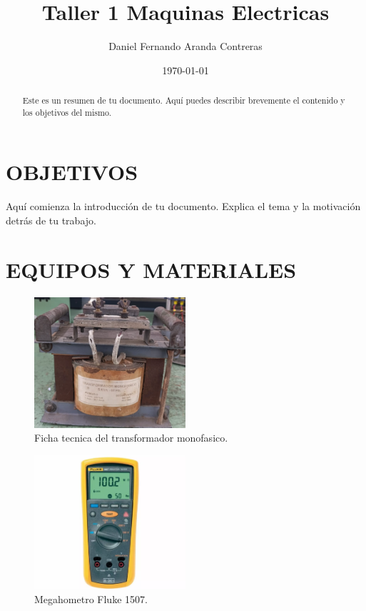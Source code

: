\documentclass[a4paper,12pt]{article} %
\title{Taller 1 Maquinas Electricas} %
\author{Daniel Fernando Aranda Contreras} %
\date{\today} %
\begin{document}
\maketitle %

\begin{abstract}
    
    Este es un resumen de tu documento. Aquí puedes describir brevemente el contenido y los objetivos del mismo.
\end{abstract}

\section{OBJETIVOS }
Aquí comienza la introducción de tu documento. Explica el tema y la motivación detrás de tu trabajo.
    
\section{EQUIPOS Y MATERIALES}
\begin{figure}[h] %
    \centering
    \includegraphics[width=0.5\textwidth]{img/Transformador monofasico.png} %
    \caption{Ficha tecnica del transformador monofasico.}
    \label{fig:mi_imagen}
\end{figure}

\begin{figure}[h] %
    \centering
    \includegraphics[width=0.5\textwidth]{img/Megahometro megger.png} %
    \caption{Megahometro Fluke 1507.}
    \label{fig:megahometro}
\end{figure}
\end{document}
